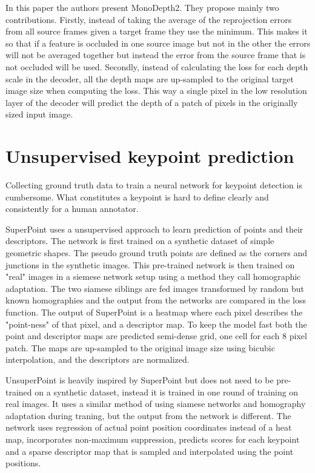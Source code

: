 In this paper\cite{monodepth2} the authors present MonoDepth2. They propose mainly two contributions. Firstly, instead of taking the average of the reprojection errors from all source frames given a target frame they use the minimum. This makes it so that if a feature is occluded in one source image but not in the other the errors will not be averaged together but instead the error from the source frame that is not occluded will be used. Secondly, instead of calculating the loss for each depth scale in the decoder, all the depth maps are up-sampled to the original target image size when computing the loss. This way a single pixel in the low resolution layer of the decoder will predict the depth of a patch of pixels in the originally sized input image.

\section{Unsupervised keypoint prediction}

Collecting ground truth data to train a neural network for keypoint detection is cumbersome. What constitutes a keypoint is hard to define clearly and consistently for a human annotator.

SuperPoint\cite{superpoint} uses a unsupervised approach to learn prediction of points and their descriptors. The network is first trained on  a synthetic dataset of simple geometric shapes. The pseudo ground truth points are defined as the corners and junctions in the synthetic images. This pre-trained network is then trained on "real" images in a siemese network setup using a method they call homographic adaptation. The two siamese siblings are fed images transformed by random but known homographies and the output from the networks are compared in the loss function. The output of SuperPoint is a heatmap where each pixel describes the "point-ness" of that pixel, and a descriptor map. To keep the model fast both the point and descriptor maps are predicted semi-dense grid,
one cell for each 8 pixel patch. The maps are up-sampled to the original image size using bicubic interpolation, and the descriptors are normalized.

UnsuperPoint\cite{unsuperpoint} is heavily inspired by SuperPoint but does not need to be pre-trained on a synthetic dataset, instead it is trained in one round of training on real images. It uses a similar method of using siamese networks and homography adaptation during traning, but the output from the network is different. The network uses regression of actual point position coordinates instead of a heat map, incorporates non-maximum suppression, predicts scores for each keypoint and a sparse descriptor map that is sampled and interpolated using the point positions.

